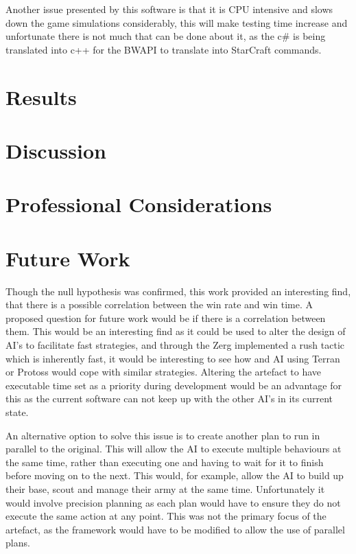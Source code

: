 \documentclass[journal]{IEEEtran}
\begin{document}
Another issue presented by this software is that it is CPU intensive and slows down the game simulations considerably, this will make testing time increase and unfortunate there is not much that can be done about it, as the c\# is being translated into c++ for the BWAPI to translate into StarCraft commands.


\section{Results}

\section{Discussion}


\section{Professional Considerations}


\section{Future Work}
Though the null hypothesis was confirmed, this work provided an interesting find, that there is a possible correlation between the win rate and win time. A proposed question for future work would be if there is a correlation between them. This would be an interesting find as it could be used to alter the design of AI's to facilitate fast strategies, and through the Zerg implemented a rush tactic which is inherently fast, it would be interesting to see how and AI using Terran or Protoss would cope with similar strategies.
Altering the artefact to have executable time set as a priority during development would be an advantage for this as the current software can not keep up with the other AI's in its current state.

An alternative option to solve this issue is to create another plan to run in parallel to the original. This will allow the AI to execute multiple behaviours at the same time, rather than executing one and having to wait for it to finish before moving on to the next. This would, for example, allow the AI to build up their base, scout and manage their army at the same time. Unfortunately it would involve precision planning as each plan would have to ensure they do not execute the same action at any point. This was not the primary focus of the artefact, as the framework would have to be modified to allow the use of parallel plans.
\end{document}
